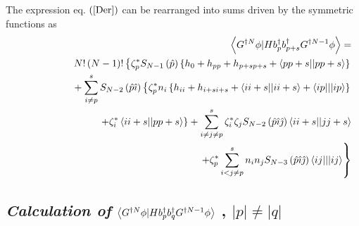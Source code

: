 \documentclass{article}
\begin{document}
The expression eq. $\left( \ref{Der}\right) $ can be rearranged into sums
driven by the symmetric functions as 
\begin{eqnarray}
&&\left\langle G^{\dagger N}\phi |Hb_{p}^{\dagger }b_{p+s}^{\dagger
}G^{\dagger N-1}\phi \right\rangle =  \notag \\
&&N!\left( N-1\right) !\left\{ \zeta _{p}^{\ast }S_{N-1}\left( \hat{p}%
\right) \left\{ h_{0}+h_{pp}+h_{p+sp+s}+\left\langle pp+s||pp+s\right\rangle
\right\} \right.  \notag \\
&&\left. {}\right. \quad +\sum_{i\neq p}^{s}S_{N-2}\left( \hat{p}\hat{\imath}%
\right) \left\{ \zeta _{p}^{\ast }n_{i}\left\{
h_{ii}+h_{i+si+s}+\left\langle ii+s||ii+s\right\rangle +\left\langle
ip|||ip\right\rangle \right\} \right.  \notag \\
&&\qquad \qquad \qquad \left. +\zeta _{i}^{\ast }\left\langle
ii+s||pp+s\right\rangle \right\} +\sum_{i\neq j\neq p}^{s}\zeta _{i}^{\ast
}\zeta _{j}S_{N-2}\left( \hat{p}\hat{\imath}\hat{\jmath}\right) \left\langle
ii+s||jj+s\right\rangle  \notag \\
&&\qquad \qquad \qquad \qquad \qquad \qquad \qquad \qquad \qquad \left.
+\zeta _{p}^{\ast }\sum_{i<j\neq p}^{s}n_{i}n_{j}S_{N-3}\left( \hat{p}\hat{%
\imath}\hat{\jmath}\right) \left\langle ij|||ij\right\rangle \right\}
\end{eqnarray}

\subsection{\textit{Calculation of} $\left\langle G^{\dagger N}\protect\phi %
|Hb_{p}^{\dagger }b_{q}^{\dagger }G^{\dagger N-1}\protect\phi \right\rangle $%
, $\left| p\right| \neq \left| q\right| $}
\end{document}
